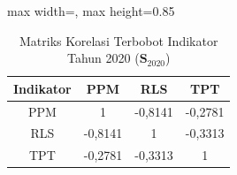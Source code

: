 \begin{table}[H]
\centering
\caption{Matriks Korelasi Terbobot Indikator Tahun 2020 ($\mathbf{S}_{2020}$)} \label{tab:sample1matriks_intra_loading_2020}
\begin{adjustbox}{max width=\textwidth, max height=0.85\textheight}
\begin{tabular}{|c|c|c|c|}
\hline
\textbf{Indikator} & \textbf{PPM} & \textbf{RLS} & \textbf{TPT} \\
\hline
PPM & 1 & -0,8141 & -0,2781 \\
RLS & -0,8141 & 1 & -0,3313 \\
TPT & -0,2781 & -0,3313 & 1 \\
\hline
\end{tabular}
\end{adjustbox}
\end{table}